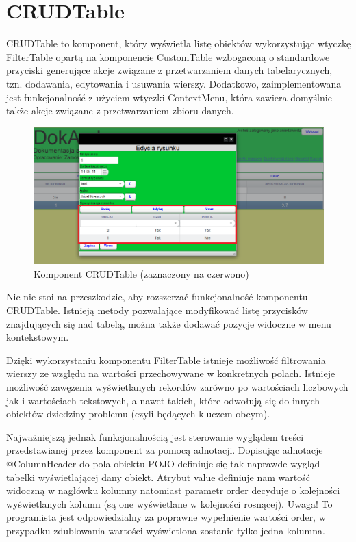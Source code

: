 \section{CRUDTable}
CRUDTable to komponent, który wyświetla listę obiektów wykorzystując wtyczkę FilterTable opartą na komponencie CustomTable wzbogaconą o standardowe przyciski generujące akcje związane z przetwarzaniem danych tabelarycznych, tzn. dodawania, edytowania i usuwania wierszy. Dodatkowo, zaimplementowana jest funkcjonalność z użyciem wtyczki ContextMenu, która zawiera domyślnie także akcje związane z przetwarzaniem zbioru danych.

\begin{figure} [H]
    \begin{center}
	\includegraphics[scale=.6]{img/crudTable.png}
	\caption{Komponent CRUDTable (zaznaczony na czerwono)}
	\label{crudTable}
    \end{center}
\end{figure}

Nic nie stoi na przeszkodzie, aby rozszerzać funkcjonalność komponentu CRUDTable. Istnieją metody pozwalające modyfikować listę przycisków znajdujących się nad tabelą, można także dodawać pozycje widoczne w menu kontekstowym.

\newpage
Dzięki wykorzystaniu komponentu FilterTable istnieje możliwość filtrowania wierszy ze względu na wartości przechowywane w konkretnych polach. Istnieje możliwość zawężenia wyświetlanych rekordów zarówno po wartościach liczbowych jak i wartościach tekstowych, a nawet takich, które odwołują się do innych obiektów dziedziny problemu (czyli będących kluczem obcym).

Najważniejszą jednak funkcjonalnością jest sterowanie wyglądem treści przedstawianej przez komponent za pomocą adnotacji. Dopisując adnotacje @ColumnHeader do pola obiektu POJO definiuje się tak naprawde wygląd tabelki wyświetlającej dany obiekt. Atrybut value definiuje nam wartość widoczną w nagłówku kolumny natomiast parametr order decyduje o kolejności wyświetlanych kolumn (są one wyświetlane w kolejności rosnącej). Uwaga! To programista jest odpowiedzialny za poprawne wypełnienie wartości order, w przypadku zdublowania wartości wyświetlona zostanie tylko jedna kolumna.

